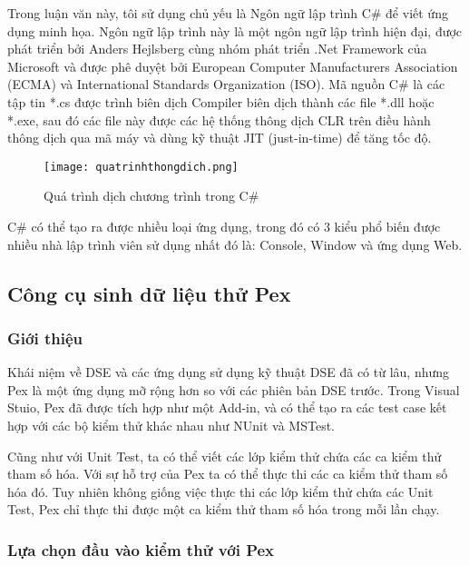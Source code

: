 Trong luận văn này, tôi sử dụng chủ yếu là Ngôn ngữ lập trình C\# để viết ứng dụng minh họa. Ngôn ngữ lập trình này là một ngôn ngữ lập trình hiện đại, được phát triển bởi Anders Hejlsberg cùng nhóm phát triển .Net Framework của Microsoft và được phê duyệt bởi European Computer Manufacturers Association (ECMA) và International Standards Organization (ISO). Mã nguồn C\# là các tập tin *.cs được trình biên dịch Compiler biên dịch thành các file *.dll hoặc *.exe, sau đó các file này được các hệ thống thông dịch CLR trên điều hành thông dịch qua mã máy và dùng kỹ thuật JIT (just-in-time) để tăng tốc độ.

\begin{center}
  \begin{figure}[H]
    \begin{center}
      \texttt{[image: quatrinhthongdich.png]}
    \end{center}
    \caption{Quá trình dịch chương trình trong C\#}
  \end{figure}
\end{center}

C\# có thể tạo ra được nhiều loại ứng dụng, trong đó có 3 kiểu phổ biến được nhiều nhà lập trình viên sử dụng nhất đó là: Console, Window và ứng dụng Web. 

\subsection{Công cụ sinh dữ liệu thử Pex}
\subsubsection*{Giới thiệu}
Khái niệm về DSE và các ứng dụng sử dụng kỹ thuật DSE đã có từ lâu, nhưng Pex là một ứng dụng mỡ rộng hơn so với các phiên bản DSE trước. Trong Visual Stuio, Pex đã được tích hợp như một Add-in, và có thể tạo ra các test case kết hợp với các bộ kiểm thử khác nhau như NUnit và MSTest. 

Cũng như với Unit Test, ta có thể viết các lớp kiểm thử chứa các ca kiểm thử tham số hóa. Với sự hỗ trợ của Pex ta có thể thực thi các ca kiểm thử tham số hóa đó. Tuy nhiên không giống việc thực thi các lớp kiểm thử chứa các Unit Test, Pex chỉ thực thi được một ca kiểm thử tham số hóa trong mỗi lần chạy.



\subsubsection*{Lựa chọn đầu vào kiểm thử với Pex}

